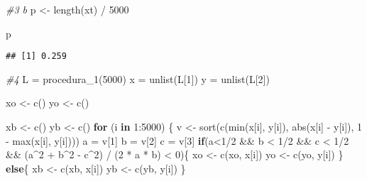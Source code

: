 \documentclass[
]{article}
\newenvironment{Shaded}{\begin{snugshade}}{\end{snugshade}}
\newcommand{\CommentTok}[1]{\textcolor[rgb]{0.56,0.35,0.01}{\textit{#1}}}
\newcommand{\ControlFlowTok}[1]{\textcolor[rgb]{0.13,0.29,0.53}{\textbf{#1}}}
\newcommand{\DecValTok}[1]{\textcolor[rgb]{0.00,0.00,0.81}{#1}}
\newcommand{\FunctionTok}[1]{\textcolor[rgb]{0.00,0.00,0.00}{#1}}
\newcommand{\NormalTok}[1]{#1}
\newcommand{\OtherTok}[1]{\textcolor[rgb]{0.56,0.35,0.01}{#1}}
\newcommand{\SpecialCharTok}[1]{\textcolor[rgb]{0.00,0.00,0.00}{#1}}
\begin{document}
\begin{Shaded}
\begin{Highlighting}[]
\CommentTok{\#3 b}
\NormalTok{p }\OtherTok{\textless{}{-}} \FunctionTok{length}\NormalTok{(xt) }\SpecialCharTok{/} \DecValTok{5000}

\NormalTok{p}
\end{Highlighting}
\end{Shaded}

\begin{verbatim}
## [1] 0.259
\end{verbatim}

\begin{Shaded}
\begin{Highlighting}[]
\CommentTok{\#4}
\NormalTok{L }\OtherTok{=} \FunctionTok{procedura\_1}\NormalTok{(}\DecValTok{5000}\NormalTok{)}
\NormalTok{x }\OtherTok{=} \FunctionTok{unlist}\NormalTok{(L[}\DecValTok{1}\NormalTok{])}
\NormalTok{y }\OtherTok{=} \FunctionTok{unlist}\NormalTok{(L[}\DecValTok{2}\NormalTok{])}

\NormalTok{xo }\OtherTok{\textless{}{-}} \FunctionTok{c}\NormalTok{()}
\NormalTok{yo }\OtherTok{\textless{}{-}} \FunctionTok{c}\NormalTok{()}

\NormalTok{xb }\OtherTok{\textless{}{-}} \FunctionTok{c}\NormalTok{()}
\NormalTok{yb }\OtherTok{\textless{}{-}} \FunctionTok{c}\NormalTok{()}
\ControlFlowTok{for}\NormalTok{ (i }\ControlFlowTok{in} \DecValTok{1}\SpecialCharTok{:}\DecValTok{5000}\NormalTok{)}
\NormalTok{\{}
\NormalTok{  v }\OtherTok{\textless{}{-}} \FunctionTok{sort}\NormalTok{(}\FunctionTok{c}\NormalTok{(}\FunctionTok{min}\NormalTok{(x[i], y[i]), }\FunctionTok{abs}\NormalTok{(x[i] }\SpecialCharTok{{-}}\NormalTok{ y[i]), }\DecValTok{1} \SpecialCharTok{{-}} \FunctionTok{max}\NormalTok{(x[i], y[i])))}
\NormalTok{  a }\OtherTok{=}\NormalTok{ v[}\DecValTok{1}\NormalTok{]}
\NormalTok{  b }\OtherTok{=}\NormalTok{ v[}\DecValTok{2}\NormalTok{]}
\NormalTok{  c }\OtherTok{=}\NormalTok{ v[}\DecValTok{3}\NormalTok{]}
  \ControlFlowTok{if}\NormalTok{(a}\SpecialCharTok{\textless{}}\DecValTok{1}\SpecialCharTok{/}\DecValTok{2} \SpecialCharTok{\&\&}\NormalTok{ b }\SpecialCharTok{\textless{}} \DecValTok{1}\SpecialCharTok{/}\DecValTok{2} \SpecialCharTok{\&\&}\NormalTok{ c }\SpecialCharTok{\textless{}} \DecValTok{1}\SpecialCharTok{/}\DecValTok{2} \SpecialCharTok{\&\&}\NormalTok{ (a}\SpecialCharTok{\^{}}\DecValTok{2} \SpecialCharTok{+}\NormalTok{ b}\SpecialCharTok{\^{}}\DecValTok{2} \SpecialCharTok{{-}}\NormalTok{ c}\SpecialCharTok{\^{}}\DecValTok{2}\NormalTok{) }\SpecialCharTok{/}\NormalTok{ (}\DecValTok{2} \SpecialCharTok{*}\NormalTok{ a }\SpecialCharTok{*}\NormalTok{ b) }\SpecialCharTok{\textless{}} \DecValTok{0}\NormalTok{)\{}
\NormalTok{    xo }\OtherTok{\textless{}{-}} \FunctionTok{c}\NormalTok{(xo, x[i])}
\NormalTok{    yo }\OtherTok{\textless{}{-}} \FunctionTok{c}\NormalTok{(yo, y[i])}
\NormalTok{  \}}
  \ControlFlowTok{else}\NormalTok{\{}
\NormalTok{    xb }\OtherTok{\textless{}{-}} \FunctionTok{c}\NormalTok{(xb, x[i])}
\NormalTok{    yb }\OtherTok{\textless{}{-}} \FunctionTok{c}\NormalTok{(yb, y[i])}
\NormalTok{  \}}
    

\end{Highlighting}
\end{Shaded}
\end{document}
